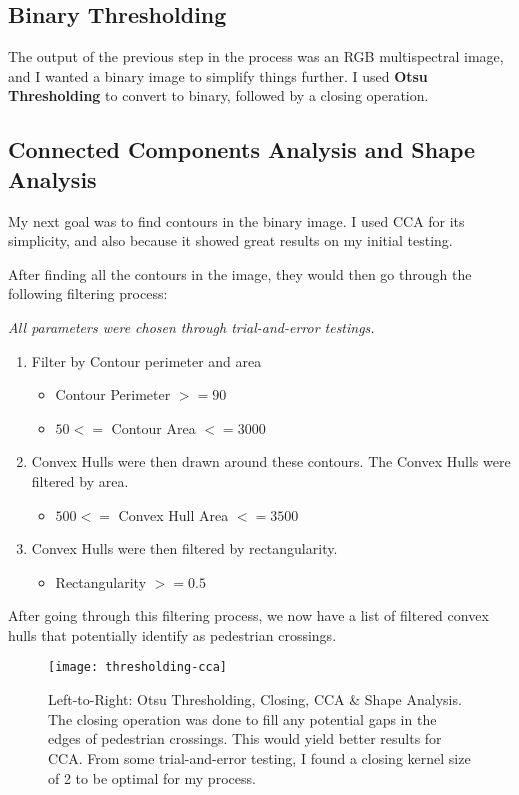 \documentclass{article}  %
\begin{document}
	\subsection{Binary Thresholding}
	
	The output of the previous step in the process was an RGB multispectral image, and I wanted a binary image to simplify things further. I used \textbf{Otsu Thresholding} to convert to binary, followed by a closing operation.
	
	\subsection{Connected Components Analysis and Shape Analysis}
	
	My next goal was to find contours in the binary image. I used CCA for its simplicity, and also because it showed great results on my initial testing.
	
	After finding all the contours in the image, they would then go through the following filtering process:
	
	\emph{All parameters were chosen through trial-and-error testings.}
	
	\begin{enumerate}
		\item Filter by Contour perimeter and area
		\begin{itemize}
			\item Contour Perimeter $>= 90$
			\item $50 <= $ Contour Area $ <= 3000$
		\end{itemize}
		\item Convex Hulls were then drawn around these contours. The Convex Hulls were filtered by area.
		\begin{itemize}
			\item $500 <= $ Convex Hull Area $ <= 3500$
		\end{itemize}
		\item Convex Hulls were then filtered by rectangularity.
		\begin{itemize}
			\item Rectangularity $>= 0.5$
		\end{itemize}
	\end{enumerate}
	
	After going through this filtering process, we now have a list of filtered convex hulls that potentially identify as pedestrian crossings.
	
	\begin{figure}[H]
		\centering
		\texttt{[image: thresholding-cca]}
		\caption{Left-to-Right: Otsu Thresholding, Closing, CCA \& Shape Analysis. The closing operation was done to fill any potential gaps in the edges of pedestrian crossings. This would yield better results for CCA. From some trial-and-error testing, I found a closing kernel size of 2 to be optimal for my process.}
	\end{figure}
\end{document}

